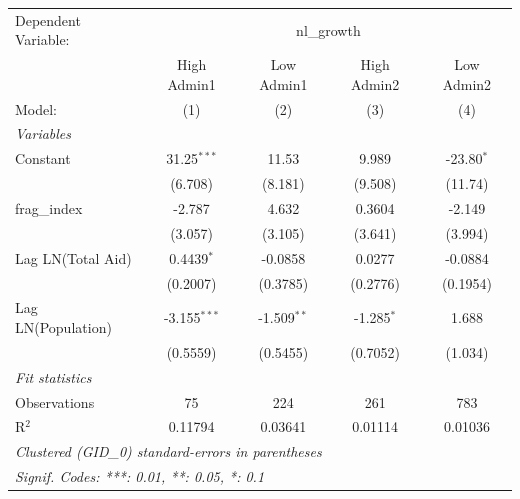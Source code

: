 
\begingroup
\centering
\begin{tabular}{lcccc}
   \tabularnewline \midrule \midrule
   Dependent Variable: & \multicolumn{4}{c}{nl\_growth}\\
                      & High Admin1    & Low Admin1    & High Admin2  & Low Admin2 \\   
   Model:             & (1)            & (2)           & (3)          & (4)\\  
   \midrule
   \emph{Variables}\\
   Constant           & 31.25$^{***}$  & 11.53         & 9.989        & -23.80$^{*}$\\   
                      & (6.708)        & (8.181)       & (9.508)      & (11.74)\\   
   frag\_index        & -2.787         & 4.632         & 0.3604       & -2.149\\   
                      & (3.057)        & (3.105)       & (3.641)      & (3.994)\\   
   Lag LN(Total Aid)  & 0.4439$^{*}$   & -0.0858       & 0.0277       & -0.0884\\   
                      & (0.2007)       & (0.3785)      & (0.2776)     & (0.1954)\\   
   Lag LN(Population) & -3.155$^{***}$ & -1.509$^{**}$ & -1.285$^{*}$ & 1.688\\   
                      & (0.5559)       & (0.5455)      & (0.7052)     & (1.034)\\   
   \midrule
   \emph{Fit statistics}\\
   Observations       & 75             & 224           & 261          & 783\\  
   R$^2$              & 0.11794        & 0.03641       & 0.01114      & 0.01036\\  
   \midrule \midrule
   \multicolumn{5}{l}{\emph{Clustered (GID\_0) standard-errors in parentheses}}\\
   \multicolumn{5}{l}{\emph{Signif. Codes: ***: 0.01, **: 0.05, *: 0.1}}\\
\end{tabular}
\par\endgroup



